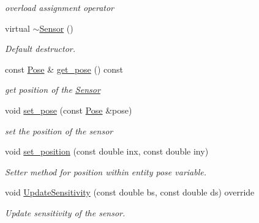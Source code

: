 \begin{DoxyCompactItemize}
\begin{DoxyCompactList}\small\item\em overload assignment operator \end{DoxyCompactList}\item 
virtual \hyperlink{classSensor_aa730e9961dd645e9df9644c52b6e72eb}{$\sim$\+Sensor} ()\hypertarget{classSensor_aa730e9961dd645e9df9644c52b6e72eb}{}\label{classSensor_aa730e9961dd645e9df9644c52b6e72eb}

\begin{DoxyCompactList}\small\item\em Default destructor. \end{DoxyCompactList}\item 
const \hyperlink{structPose}{Pose} \& \hyperlink{classSensor_a342fd9294709f47ebfafaf4cd76b0e19}{get\+\_\+pose} () const 
\begin{DoxyCompactList}\small\item\em get position of the \hyperlink{classSensor}{Sensor} \end{DoxyCompactList}\item 
void \hyperlink{classSensor_a8c0ebd31f6d6203c717e1a77acb0e6bb}{set\+\_\+pose} (const \hyperlink{structPose}{Pose} \&pose)
\begin{DoxyCompactList}\small\item\em set the position of the sensor \end{DoxyCompactList}\item 
void \hyperlink{classSensor_aa38343db9a4da55dde95cb2579204b06}{set\+\_\+position} (const double inx, const double iny)\hypertarget{classSensor_aa38343db9a4da55dde95cb2579204b06}{}\label{classSensor_aa38343db9a4da55dde95cb2579204b06}

\begin{DoxyCompactList}\small\item\em Setter method for position within entity pose variable. \end{DoxyCompactList}\item 
void \hyperlink{classSensor_a0269a89e5e108e19120d220aaf6159c8}{Update\+Sensitivity} (const double bs, const double ds) override
\begin{DoxyCompactList}\small\item\em Update sensitivity of the sensor. \end{DoxyCompactList}\end{DoxyCompactItemize}
